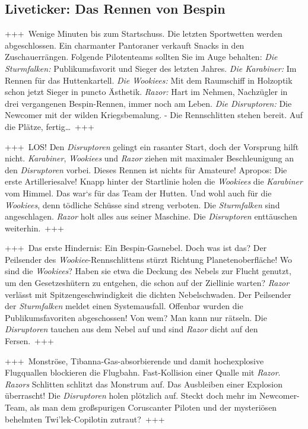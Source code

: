 \documentclass[]{multiversum}
\begin{document}
\subsection{Liveticker: Das Rennen von Bespin}
+++~Wenige Minuten bis zum Startschuss.
    Die letzten Sportwetten werden abgeschlossen.
    Ein charmanter Pantoraner verkauft Snacks in den Zuschauerrängen.
    Folgende Pilotenteams sollten Sie im Auge behalten:
    \textit{Die Sturmfalken:} Publikumsfavorit und Sieger des letzten Jahres.
    \textit{Die Karabiner:} Im Rennen für das Huttenkartell.
    \textit{Die Wookiees:} Mit dem Raumschiff in Holzoptik schon jetzt Sieger in puncto Ästhetik.
    \textit{Razor:} Hart im Nehmen, Nachzügler in drei vergangenen Bespin-Rennen, immer noch am Leben.
    \textit{Die Disruptoren:} Die Newcomer mit der wilden Kriegsbemalung.
    - Die Rennschlitten stehen bereit.
    Auf die Plätze, fertig…~+++

+++~LOS!
    Den \textit{Disruptoren} gelingt ein rasanter Start, doch der Vorsprung hilft nicht.
    \textit{Karabiner}, \textit{Wookiees} und \textit{Razor} ziehen mit maximaler Beschleunigung an den \textit{Disruptoren} vorbei.
    Dieses Rennen ist nichts für Amateure!
    Apropos: Die erste Artilleriesalve!
    Knapp hinter der Startlinie holen die \textit{Wookiees} die \textit{Karabiner} vom Himmel.
    Das war‘s für das Team der Hutten.
    Und wohl auch für die \textit{Wookiees}, denn tödliche Schüsse sind streng verboten.
    Die \textit{Sturmfalken} sind angeschlagen.
    \textit{Razor} holt alles aus seiner Maschine.
    Die \textit{Disruptoren} enttäuschen weiterhin.~+++

+++~Das erste Hindernis: Ein Bespin-Gasnebel.
    Doch was ist das?
    Der Peilsender des \textit{Wookiee}-Rennschlittens stürzt Richtung Planetenoberfläche!
    Wo sind die \textit{Wookiees}?
    Haben sie etwa die Deckung des Nebels zur Flucht genutzt, um den Gesetzeshütern zu entgehen, die schon auf der Ziellinie warten?
    \textit{Razor} verlässt mit Spitzengeschwindigkeit die dichten Nebelschwaden.
    Der Peilsender der \textit{Sturmfalken} meldet einen Systemausfall.
    Offenbar wurden die Publikumsfavoriten abgeschossen!
    Von wem?
    Man kann nur rätseln.
    Die \textit{Disruptoren} tauchen aus dem Nebel auf und sind \textit{Razor} dicht auf den Fersen.~+++

+++~Monströse, Tibanna-Gas-absorbierende und damit hochexplosive Flugquallen blockieren die Flugbahn.
    Fast-Kollision einer Qualle mit \textit{Razor}.
    \textit{Razors} Schlitten schlitzt das Monstrum auf.
    Das Ausbleiben einer Explosion überrascht! Die \textit{Disruptoren} holen plötzlich auf.
    Steckt doch mehr im Newcomer-Team, als man dem großspurigen Coruscanter Piloten und der mysteriösen behelmten Twi’lek-Copilotin zutraut?~+++
\end{document}

